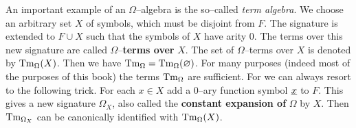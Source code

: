 An important example of an $\Omega$--algebra is the so--called {\it
term algebra}. We choose an arbitrary set $X$ of symbols, which
must be disjoint from $F$. The signature is extended to $F \cup X$
such that the symbols of $X$ have arity 0. The terms over this new
signature are called $\Omega$--\textbf{terms over} $X$.
The set of $\Omega$--terms over $X$ is denoted by
$\operatorname{Tm}_{\Omega}(X)$. Then we have $\operatorname{Tm}_{\Omega} = 
\operatorname{Tm}_{\Omega}(\varnothing)$. For many purposes (indeed 
most of the purposes of this book) the terms $\operatorname{Tm}_{\Omega}$ 
are sufficient. For we can always resort to the following trick. 
For each $x \in X$ add a 0--ary function symbol $\underline{x}$ to $F$. 
This gives a new signature $\Omega_X$, also called the 
\textbf{constant expansion of} $\Omega$ by $X$. Then 
$\operatorname{Tm}_{\Omega_X}$ can be canonically identified with 
$\operatorname{Tm}_{\Omega}(X)$.

